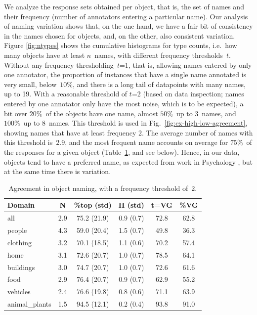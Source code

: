 We analyze the response sets obtained per object, that is, the set of names and their frequency (number of annotators entering a particular name).
Our analysis of naming variation shows that, on the one hand, we have a fair bit of consistency in the names chosen for objects, and, on the other, also consistent variation.
Figure \ref{fig:ntypes} shows the cumulative histograms for type counts, i.e.\ how many objects have at least $n$\ names, with different frequency thresholds~$t$.
Without any frequency thresholding~\mbox{$t$=1}, that is, allowing names entered by only one annotator, the proportion of instances that have a single name annotated is very small, below\ $10\%$, and there is a long tail of datapoints with many names, up to 19. 
With a reasonable threshold of $t$=2 (based on data inspection; names entered by one annotator only have the most noise, which is to be expected), a bit over $20\%$\ of the objects have one name, almost $50\%$\ up to $3$\ names, and $100\%$\ up to $8$\ names.
This threshold is used in Fig.~\ref{fig:ex-high-low-agreement}, showing names that have at least frequency 2.
The average number of names with this threshold is\ $2.9$, and the most frequent name accounts on average for $75\%$\ of the responses for a given object (Table~\ref{tab:agree}, and see below).
Hence, in our data, objects tend to have a preferred name, as expected from work in Psychology \cite{rosch1976basic,jolicoeur1984pictures}, but at the same time there is variation.

\begin{table}
\centering
\small
\begin{tabular}{lccccc}
  \toprule
  Domain &    N &         \%top (std) &          H (std) & t=VG &   \%VG \\
  \midrule
  all &  2.9 &  75.2 (21.9) &  0.9 (0.7) &   72.8 &  62.8 \\
  \midrule
  people &  4.3 &  59.0 (20.4) &  1.5 (0.7) &   49.8 &  36.3 \\
  clothing &  3.2 &  70.1 (18.5) &  1.1 (0.6) &   70.2 &  57.4\\
  home &  3.1 &  72.6 (20.7) &  1.0 (0.7) &   78.5 &  64.1 \\
  buildings &  3.0 &  74.7 (20.7) &  1.0 (0.7) &   72.6 &  61.6\\
  food &  2.9 &  76.4 (20.7) &  0.9 (0.7) &   62.9 &  55.2 \\
  vehicles &  2.4 &  76.6 (19.8) &  0.8 (0.6) &   71.1 &  63.9 \\
  animal\_plants &  1.5 &  94.5 (12.1) &  0.2 (0.4) &   93.8 &  91.0\\
\bottomrule
\end{tabular}
\vspace{-0.3cm}
\caption{Agreement in object naming, with a frequency threshold of~$2$.}
\label{tab:agree}
\end{table}

